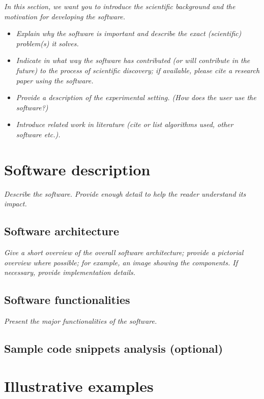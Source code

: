 \documentclass[11pt, a4paper, oneside, onecolumn]{article}
\begin{document}
\textit{In this section, we want you to introduce the scientific background and the motivation for developing the software.}

\begin{itemize}
    \item \textit{Explain why the software is important and describe the exact (scientific) problem(s) it solves.}
    \item \textit{Indicate in what way the software has contributed (or will contribute in the future) to the process of scientific discovery; if available, please cite a research paper using the software.}
    \item \textit{Provide a description of the experimental setting. (How does the user use the software?)}
    \item \textit{Introduce related work in literature (cite or list algorithms used, other software etc.).}
\end{itemize}

\section{Software description}

\textit{Describe the software. Provide enough detail to help the reader understand its impact. }

\subsection{Software architecture}
\textit{  Give a short overview of the overall software architecture; provide a pictorial overview where possible; for example, an image showing the components. If necessary, provide implementation details.}

 \subsection{Software functionalities}
\textit{  Present the major functionalities of the software.}
  
 \subsection{Sample code snippets analysis (optional)}


\section{Illustrative examples}
\end{document}
